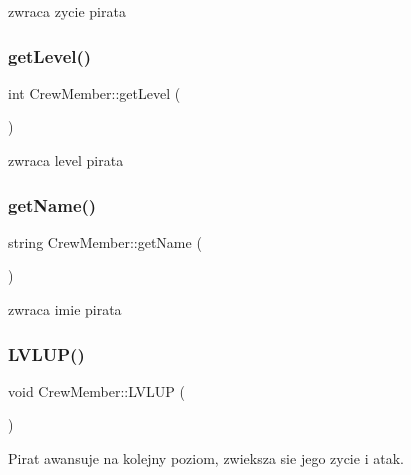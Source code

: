 zwraca zycie pirata 

\mbox{\label{class_crew_member_ad2690b5ea050ff33c969b4b8c18d88b3}} 
\subsubsection{\texorpdfstring{get\+Level()}{getLevel()}}
{\footnotesize\ttfamily int Crew\+Member\+::get\+Level (\begin{DoxyParamCaption}{ }\end{DoxyParamCaption})\hspace{0.3cm}{\ttfamily [inline]}}



zwraca level pirata 

\mbox{\label{class_crew_member_a730e140e62942ff6e0ecaf13a5659479}} 
\subsubsection{\texorpdfstring{get\+Name()}{getName()}}
{\footnotesize\ttfamily string Crew\+Member\+::get\+Name (\begin{DoxyParamCaption}{ }\end{DoxyParamCaption})\hspace{0.3cm}{\ttfamily [inline]}}



zwraca imie pirata 

\mbox{\label{class_crew_member_a704d4e951b7b794e1f2acc4072fd4234}} 
\subsubsection{\texorpdfstring{L\+V\+L\+U\+P()}{LVLUP()}}
{\footnotesize\ttfamily void Crew\+Member\+::\+L\+V\+L\+UP (\begin{DoxyParamCaption}{ }\end{DoxyParamCaption})}



Pirat awansuje na kolejny poziom, zwieksza sie jego zycie i atak. 


